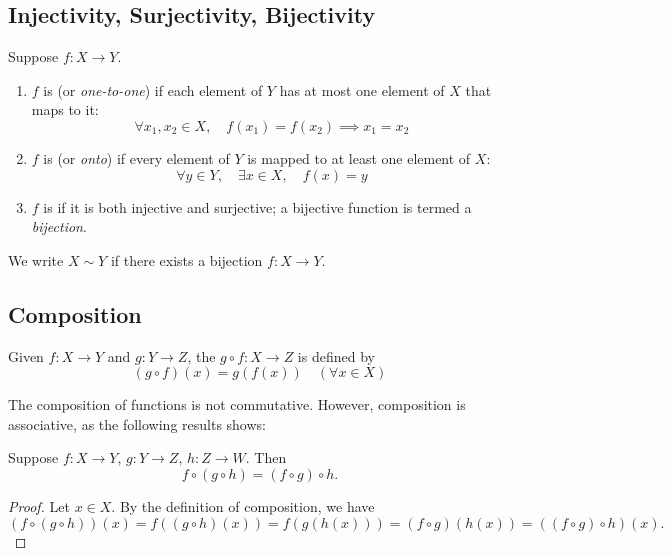 \subsection{Injectivity, Surjectivity, Bijectivity}
\begin{definition}
Suppose $f:X\to Y$.
\begin{enumerate}[label=(\roman*)]
\item $f$ is  (or \emph{one-to-one}) if each element of $Y$ has at most one element of $X$ that maps to it:
\[\forall x_1,x_2\in X,\quad f(x_1)=f(x_2) \implies x_1=x_2\]

\item $f$ is  (or \emph{onto}) if every element of $Y$ is mapped to at least one element of $X$:
\[ \forall y\in Y,\quad\exists x\in X,\quad f(x)=y \]

\item $f$ is  if it is both injective and surjective; a bijective function is termed a \emph{bijection}.
\end{enumerate}
\end{definition}

\begin{notation}
We write $X\sim Y$ if there exists a bijection $f:X\to Y$.
\end{notation}

\subsection{Composition}
\begin{definition}[Composition]
Given $f:X\to Y$ and $g:Y\to Z$, the  $g\circ f:X\to Z$ is defined by
\[ (g \circ f)(x)=g(f(x))\quad(\forall x \in X)\]
\end{definition}

The composition of functions is not commutative. However, composition is associative, as the following results shows:

\begin{proposition}
Suppose $f:X\to Y$, $g:Y\to Z$, $h:Z\to W$. Then
\[f\circ (g\circ h)=(f\circ g)\circ h.\]
\end{proposition}

\begin{proof}
Let $x\in X$. By the definition of composition, we have
\[(f\circ(g\circ h))(x)=f((g\circ h)(x))=f(g(h(x)))=(f\circ g)(h(x))=((f\circ g)\circ h)(x).\]
\end{proof}

